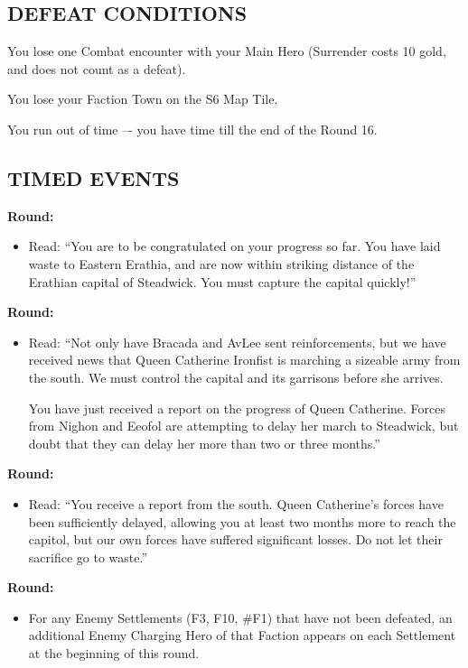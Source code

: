 \begin{multicols*}{2}
\subsection*{\MakeUppercase{Defeat Conditions}}

You lose one Combat encounter with your Main Hero (Surrender costs 10 gold, and does not count as a defeat).

You lose your Faction Town on the S6 Map Tile.

You run out of time –- you have time till the end of the Round 16.

\subsection*{\MakeUppercase{Timed Events}}

\textbf{ Round:}
\begin{itemize}
  \item Read: ``You are to be congratulated on your progress so far.
    You have laid waste to Eastern Erathia, and are now within striking distance of the Erathian
    capital of Steadwick. You must capture the capital quickly!''
\end{itemize}

\textbf{ Round:}
\begin{itemize}
  \item Read: ``Not only have Bracada and AvLee sent reinforcements, but we have received news that
    Queen Catherine Ironfist is marching a sizeable army from the south. We must control the capital and its
    garrisons before she arrives.

    You have just received a report on the progress of Queen Catherine.
    Forces from Nighon and Eeofol are attempting to delay her march to Steadwick,
    but doubt that they can delay her more than two or three months.''
\end{itemize}

\textbf{ Round:}
\begin{itemize}
  \item Read: ``You receive a report from the south. Queen Catherine's forces have been sufficiently delayed,
    allowing you at least two months more to reach the capitol, but our own forces have suffered significant
    losses. Do not let their sacrifice go to waste.''
\end{itemize}

\textbf{ Round:}
\begin{itemize}
  \item For any Enemy Settlements (F3, F10, \#F1) that have not been defeated, an additional Enemy
    Charging Hero of that Faction appears on each Settlement at the beginning of this round.
\end{itemize}


\end{multicols*}
